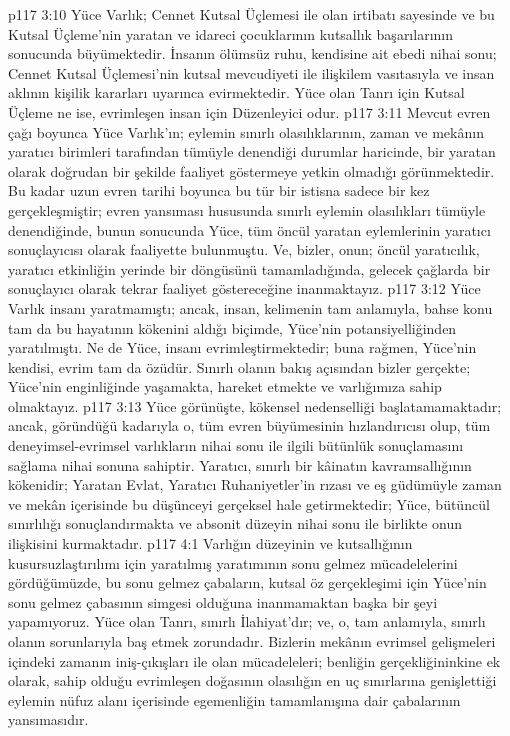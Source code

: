 \vs p117 3:10 Yüce Varlık; Cennet Kutsal Üçlemesi ile olan irtibatı sayesinde ve bu Kutsal Üçleme’nin yaratan ve idareci çocuklarının kutsallık başarılarının sonucunda büyümektedir. İnsanın ölümsüz ruhu, kendisine ait ebedi nihai sonu; Cennet Kutsal Üçlemesi’nin kutsal mevcudiyeti ile ilişkilem vasıtasıyla ve insan aklının kişilik kararları uyarınca evirmektedir. Yüce olan Tanrı için Kutsal Üçleme ne ise, evrimleşen insan için Düzenleyici odur.
\vs p117 3:11 Mevcut evren çağı boyunca Yüce Varlık’ın; eylemin sınırlı olasılıklarının, zaman ve mekânın yaratıcı birimleri tarafından tümüyle denendiği durumlar haricinde, bir yaratan olarak doğrudan bir şekilde faaliyet göstermeye yetkin olmadığı görünmektedir. Bu kadar uzun evren tarihi boyunca bu tür bir istisna sadece bir kez gerçekleşmiştir; evren yansıması hususunda sınırlı eylemin olasılıkları tümüyle denendiğinde, bunun sonucunda Yüce, tüm öncül yaratan eylemlerinin yaratıcı sonuçlayıcısı olarak faaliyette bulunmuştu. Ve, bizler, onun; öncül yaratıcılık, yaratıcı etkinliğin yerinde bir döngüsünü tamamladığında, gelecek çağlarda bir sonuçlayıcı olarak tekrar faaliyet göstereceğine inanmaktayız.
\vs p117 3:12 Yüce Varlık insanı yaratmamıştı; ancak, insan, kelimenin tam anlamıyla, bahse konu tam da bu hayatının kökenini aldığı biçimde, Yüce’nin potansiyelliğinden yaratılmıştı. Ne de Yüce, insanı evrimleştirmektedir; buna rağmen, Yüce’nin kendisi, evrim tam da özüdür. Sınırlı olanın bakış açısından bizler gerçekte; Yüce’nin enginliğinde yaşamakta, hareket etmekte ve varlığımıza sahip olmaktayız.
\vs p117 3:13 Yüce görünüşte, kökensel nedenselliği başlatamamaktadır; ancak, göründüğü kadarıyla o, tüm evren büyümesinin hızlandırıcısı olup, tüm deneyimsel\hyp{}evrimsel varlıkların nihai sonu ile ilgili bütünlük sonuçlamasını sağlama nihai sonuna sahiptir. Yaratıcı, sınırlı bir kâinatın kavramsallığının kökenidir; Yaratan Evlat, Yaratıcı Ruhaniyetler’in rızası ve eş güdümüyle zaman ve mekân içerisinde bu düşünceyi gerçeksel hale getirmektedir; Yüce, bütüncül sınırlılığı sonuçlandırmakta ve absonit düzeyin nihai sonu ile birlikte onun ilişkisini kurmaktadır.
\vs p117 4:1 Varlığın düzeyinin ve kutsallığının kusursuzlaştırılımı için yaratılmış yaratımının sonu gelmez mücadelelerini gördüğümüzde, bu sonu gelmez çabaların, kutsal öz gerçekleşimi için Yüce’nin sonu gelmez çabasının simgesi olduğuna inanmamaktan başka bir şeyi yapamıyoruz. Yüce olan Tanrı, sınırlı İlahiyat’dır; ve, o, tam anlamıyla, sınırlı olanın sorunlarıyla baş etmek zorundadır. Bizlerin mekânın evrimsel gelişmeleri içindeki zamanın iniş\hyp{}çıkışları ile olan mücadeleleri; benliğin gerçekliğininkine ek olarak, sahip olduğu evrimleşen doğasının olasılığın en uç sınırlarına genişlettiği eylemin nüfuz alanı içerisinde egemenliğin tamamlanışına dair çabalarının yansımasıdır.

